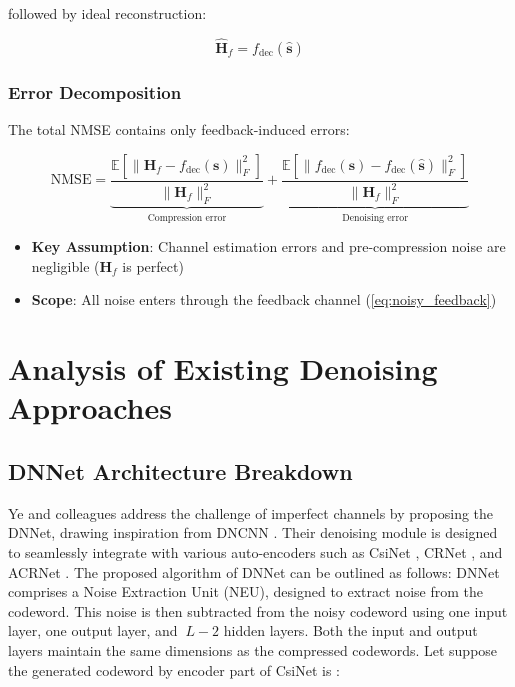 \documentclass[lettersize,journal]{IEEEtran}
\begin{document}
followed by ideal reconstruction:

\begin{equation}
    \hat{\mathbf{H}}_f = f_{\text{dec}}(\hat{\mathbf{s}})
\end{equation}

\subsubsection{Error Decomposition}
The total NMSE contains only feedback-induced errors:

\begin{equation}
    \text{NMSE} = \underbrace{\frac{\mathbb{E}[\|\mathbf{H}_f - f_{\text{dec}}(\mathbf{s})\|_F^2]}{\|\mathbf{H}_f\|_F^2}}_{\text{Compression error}} + \underbrace{\frac{\mathbb{E}[\|f_{\text{dec}}(\mathbf{s}) - f_{\text{dec}}(\hat{\mathbf{s}})\|_F^2]}{\|\mathbf{H}_f\|_F^2}}_{\text{Denoising error}}
\end{equation}

\begin{itemize}
    \item \textbf{Key Assumption}: Channel estimation errors and pre-compression noise are negligible ($\mathbf{H}_f$ is perfect)
    \item \textbf{Scope}: All noise enters through the feedback channel (\eqref{eq:noisy_feedback})
\end{itemize}

\section{Analysis of Existing Denoising Approaches}
\subsection{DNNet Architecture Breakdown}
Ye and colleagues \cite{abw} address the challenge of imperfect channels by proposing the DNNet, drawing inspiration from DNCNN \cite{ccc1}. Their denoising module is designed to seamlessly integrate with various auto-encoders such as CsiNet \cite{abe}, CRNet \cite{abn}, and ACRNet \cite{aby}.
The proposed algorithm of DNNet can be outlined as follows:
DNNet comprises a Noise Extraction Unit (NEU), designed to extract noise from the codeword. This noise is then subtracted from the noisy codeword using one input layer, one output layer, and 
\begin{math} \ L-2 \end{math} hidden layers. Both the input and output layers maintain the same dimensions as the compressed codewords. Let suppose the generated codeword by encoder part of CsiNet is :
\end{document}
